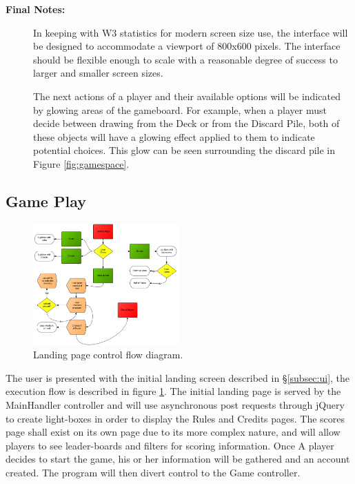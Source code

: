 \documentclass[12pt]{IEEEtran}
\begin{document}
\begin{description}
	\item[\textbf{Final Notes:}] \hspace{3em} In keeping with W3 statistics for modern screen size use, the interface will be designed to accommodate a viewport of 800x600 pixels. The interface should be flexible enough to scale with a reasonable degree of success to larger and smaller screen sizes. 
	
	The next actions of a player and their available options will be indicated by glowing areas of the gameboard. For example, when a player must decide between drawing from the Deck or from the Discard Pile, both of these objects will have a glowing effect applied to them to indicate potential choices. This glow can be seen surrounding the discard pile in Figure \ref{fig:gamespace}. 
	
	\end{description}

\subsection{Game Play}
\label{subsec:gameplay}

	\begin{figure}[h]
		\centering
		\includegraphics[width=0.5\textwidth]{landingpage.png}
		\caption{Landing page control flow diagram. }
		\label{fig:landingpage}
	\end{figure}

	The user is presented with the initial landing screen described in \S\ref{subsec:ui}, the execution flow is described in figure \ref{fig:landingpage}. The initial landing page is served by the MainHandler controller and will use asynchronous post requests through jQuery to create light-boxes in order to display the Rules and Credits pages. The scores page shall exist on its own page due to its more complex nature, and will allow players to see leader-boards and filters for scoring information. Once A player decides to start the game, his or her information will be gathered and an account created. The program will then divert control to the Game controller.
\end{document}
